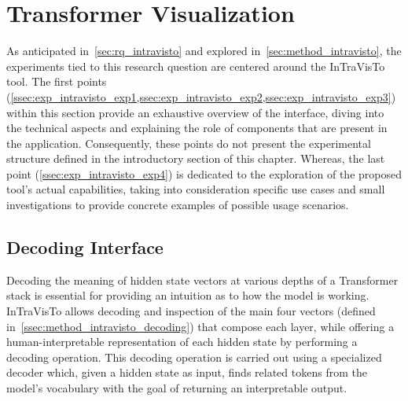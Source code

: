\section{Transformer Visualization}\label{sec:exp_intravisto}

As anticipated in~\cref{sec:rq_intravisto} and explored in~\cref{sec:method_intravisto}, the experiments tied to this research question are centered around the InTraVisTo tool.
The first points (\cref{ssec:exp_intravisto_exp1,ssec:exp_intravisto_exp2,ssec:exp_intravisto_exp3}) within this section provide an exhaustive overview of the interface, diving into the technical aspects and explaining the role of components that are present in the application.
Consequently, these points do not present the experimental structure defined in the introductory section of this chapter.
Whereas, the last point (\cref{ssec:exp_intravisto_exp4}) is dedicated to the exploration of the proposed tool's actual capabilities, taking into consideration specific use cases and small investigations to provide concrete examples of possible usage scenarios.

\subsection{Decoding Interface}\label{ssec:exp_intravisto_exp1}

Decoding the meaning of hidden state vectors at various depths of a Transformer stack is essential for providing an intuition as to how the model is working.
InTraVisTo allows decoding and inspection of the main four vectors (defined in~\cref{ssec:method_intravisto_decoding}) that compose each layer, while offering a human-interpretable representation of each hidden state by performing a decoding operation.
This decoding operation is carried out using a specialized decoder which, given a hidden state as input, finds related tokens from the model's vocabulary with the goal of returning an interpretable output.

